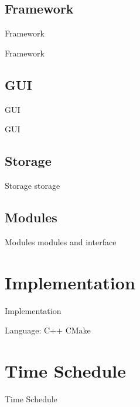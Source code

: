 \documentclass{beamer}
\newcommand{\beginbackup}{
   \newcounter{framenumbervorappendix}
   \setcounter{framenumbervorappendix}{\value{framenumber}}
}
\newcommand{\backupend}{
   \addtocounter{framenumbervorappendix}{-\value{framenumber}}
   \addtocounter{framenumber}{\value{framenumbervorappendix}}
}
\begin{document}
\subsection{Framework}
\begin{frame}{Framework}

	Framework
\end{frame}

\subsection{GUI}
\begin{frame}{GUI}

	GUI
\end{frame}

\subsection{Storage}
\begin{frame}{Storage}
	storage
\end{frame}

\subsection{Modules}
\begin{frame}{Modules}
	modules and interface
\end{frame}

\section{Implementation}
\begin{frame}{Implementation}

	Language: C++
	CMake

\end{frame}

\section{Time Schedule}
\begin{frame}{Time Schedule}


\end{frame}







\end{document}
